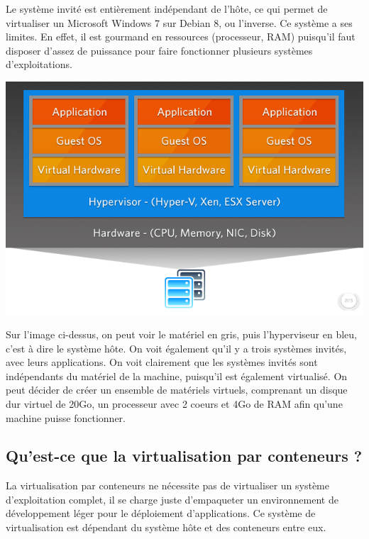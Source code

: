 \documentclass[12pt,a4paper]{article}
\begin{document}
Le système invité est entièrement indépendant de l'hôte, ce qui permet de virtualiser un Microsoft Windows 7 sur Debian 8, ou l'inverse. Ce système a ses limites. En effet, il est gourmand en ressources (processeur, RAM) puisqu'il faut disposer d'assez de puissance pour faire fonctionner plusieurs systèmes d'exploitations.

\begin{center}
  \includegraphics[width=15cm]{images_rapport/virtualisation.jpg}
\end{center}

Sur l'image ci-dessus, on peut voir le matériel en gris, puis l'hyperviseur en bleu, c'est à dire le système hôte. On voit également qu'il y a trois systèmes invités, avec leurs applications. On voit clairement que les systèmes invités sont indépendants du matériel de la machine, puisqu'il est également virtualisé. On peut décider de créer un ensemble de matériels virtuels, comprenant un disque dur virtuel de 20Go, un processeur avec 2 coeurs et 4Go de RAM afin qu'une machine puisse fonctionner.

\subsection{Qu'est-ce que la virtualisation par conteneurs ?}

La virtualisation par conteneurs ne nécessite pas de virtualiser un système d'exploitation complet, il se charge juste d'empaqueter un environnement de développement léger pour le déploiement d'applications. Ce système de virtualisation est dépendant du système hôte et des conteneurs entre eux. 
\end{document}
